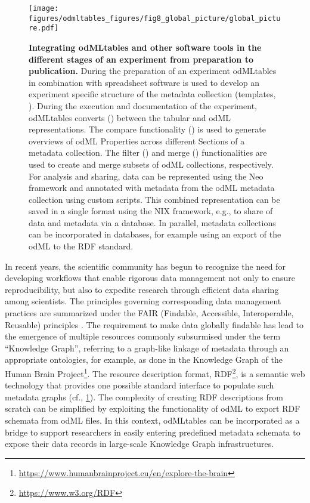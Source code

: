 \begin{figure}[!ht]
\begin{center}
\texttt{[image: figures/odmltables\_figures/fig8\_global\_picture/global\_picture.pdf]}
\caption[Integrating odMLtables and other software tools in the different stages of an experiment from preparation to publication]{\label{fig:global_workflow}
\textbf{Integrating odMLtables and other software tools in the different stages of an experiment from preparation to publication.} During the preparation of an experiment odMLtables in combination with spreadsheet software is used to develop an experiment specific structure of the metadata collection (templates, \fgenerate{}). During the execution and documentation of the experiment, odMLtables converts (\fconvert{}) between the tabular and odML representations. The compare functionality (\fcompare{}) is used to generate overviews of odML Properties across different Sections of a metadata collection. The filter (\ffilter{}) and merge (\fmerge{}) functionalities are used to create and merge subsets of odML collections, respectively. For analysis and sharing, data can be represented using the Neo framework and annotated with metadata from the odML metadata collection using custom scripts. This combined representation can be saved in a single format using the NIX framework, e.g., to share of data and metadata via a database. In parallel, metadata collections can be incorporated in databases, for example using an export of the odML to the RDF standard.}
\end{center}
\end{figure}

In recent years, the scientific community has begun to recognize the need for developing workflows that enable rigorous data management not only to ensure reproducibility, but also to expedite research through efficient data sharing among scientists. The principles governing corresponding data management practices are summarized under the FAIR (Findable, Accessible, Interoperable, Reusable) principles \citep{Wilkinson_2016}. The requirement to make data globally findable has lead to the emergence of multiple resources commonly subsurmised under the term ``Knowledge Graph'', referring to a graph-like linkage of metadata through an appropriate ontologies, for example, as done in the Knowledge Graph of the Human Brain Project\footnote{\url{https://www.humanbrainproject.eu/en/explore-the-brain}}. The resource description format, RDF\footnote{\url{https://www.w3.org/RDF}}, is a semantic web technology that provides one possible standard interface to populate such metadata graphs (cf., \cref{fig:global_workflow}). The complexity of creating RDF descriptions from scratch can be simplified by exploiting the functionality of odML to export RDF schemata from odML files. In this context, odMLtables can be incorporated as a bridge to support researchers in easily entering predefined metadata schemata to expose their data records in large-scale Knowledge Graph infrastructures.

